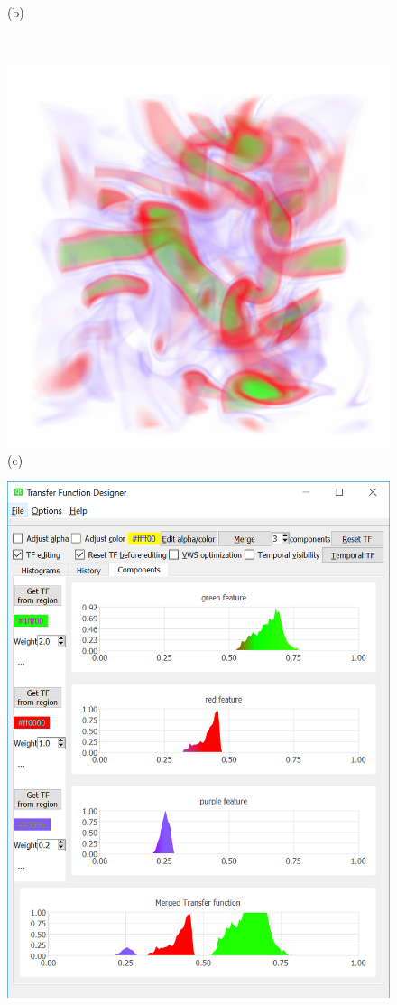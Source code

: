 \documentclass[twoside,twocolumn,10pt]{article}
\begin{document}
\begin{figure}
\begin{minipage}{.33\textwidth}
		(b)
	\end{minipage}~
	\begin{minipage}{.33\textwidth}
		\centering
		\includegraphics[width=1\linewidth]{crop/vortex_merged_segment_green_red_purple}
		(c)
	\end{minipage}
	\begin{minipage}{.33\textwidth}
		\centering
		\includegraphics[width=1\linewidth]{tf_vortex_merged_green_red_purple}

\end{minipage}
\end{figure}
\end{document}
